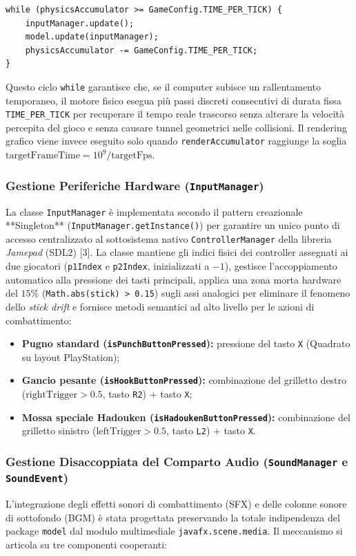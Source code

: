 \documentclass[11pt, a4paper]{article}
\begin{document}
\begin{enumerate}
\begin{verbatim}
while (physicsAccumulator >= GameConfig.TIME_PER_TICK) {
    inputManager.update();
    model.update(inputManager);
    physicsAccumulator -= GameConfig.TIME_PER_TICK;
}
\end{verbatim}
    Questo ciclo \texttt{while} garantisce che, se il computer subisce un rallentamento temporaneo, il motore fisico esegua più passi discreti consecutivi di durata fissa \texttt{TIME\_PER\_TICK} per recuperare il tempo reale trascorso senza alterare la velocità percepita del gioco e senza causare tunnel geometrici nelle collisioni. Il rendering grafico viene invece eseguito solo quando \texttt{renderAccumulator} raggiunge la soglia $\text{targetFrameTime} = 10^9 / \text{targetFps}$.
\end{enumerate}

\subsubsection{Gestione Periferiche Hardware (\texttt{InputManager})}
La classe \texttt{InputManager} è implementata secondo il pattern creazionale **Singleton** (\texttt{InputManager.getInstance()}) per garantire un unico punto di accesso centralizzato al sottosistema nativo \texttt{ControllerManager} della libreria \emph{Jamepad} (SDL2) [3]. La classe mantiene gli indici fisici dei controller assegnati ai due giocatori (\texttt{p1Index} e \texttt{p2Index}, inizializzati a $-1$), gestisce l'accoppiamento automatico alla pressione dei tasti principali, applica una zona morta hardware del $15\%$ (\texttt{Math.abs(stick) > 0.15}) sugli assi analogici per eliminare il fenomeno dello \emph{stick drift} e fornisce metodi semantici ad alto livello per le azioni di combattimento:
\begin{itemize}
    \item \textbf{Pugno standard (\texttt{isPunchButtonPressed}):} pressione del tasto \texttt{X} (Quadrato su layout PlayStation);
    \item \textbf{Gancio pesante (\texttt{isHookButtonPressed}):} combinazione del grilletto destro ($\text{rightTrigger} > 0.5$, tasto \texttt{R2}) + tasto \texttt{X};
    \item \textbf{Mossa speciale Hadouken (\texttt{isHadoukenButtonPressed}):} combinazione del grilletto sinistro ($\text{leftTrigger} > 0.5$, tasto \texttt{L2}) + tasto \texttt{X}.
\end{itemize}

\subsubsection{Gestione Disaccoppiata del Comparto Audio (\texttt{SoundManager} e \texttt{SoundEvent})}
L'integrazione degli effetti sonori di combattimento (SFX) e delle colonne sonore di sottofondo (BGM) è stata progettata preservando la totale indipendenza del package \texttt{model} dal modulo multimediale \texttt{javafx.scene.media}. Il meccanismo si articola su tre componenti cooperanti:
\end{document}

